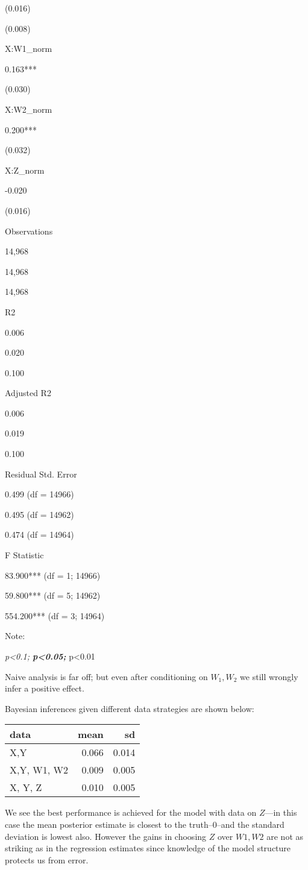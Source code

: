 \documentclass[
  12pt,
]{book}
\begin{document}
(0.016)

(0.008)

X:W1\_norm

0.163***

(0.030)

X:W2\_norm

0.200***

(0.032)

X:Z\_norm

-0.020

(0.016)

Observations

14,968

14,968

14,968

R2

0.006

0.020

0.100

Adjusted R2

0.006

0.019

0.100

Residual Std. Error

0.499 (df = 14966)

0.495 (df = 14962)

0.474 (df = 14964)

F Statistic

83.900*** (df = 1; 14966)

59.800*** (df = 5; 14962)

554.200*** (df = 3; 14964)

Note:

\emph{p\textless0.1; \textbf{p\textless0.05; }}p\textless0.01

Naive analysis is far off; but even after conditioning on \(W_1, W_2\) we still wrongly infer a positive effect.

Bayesian inferences given different data strategies are shown below:

\begin{tabular}{l|r|r}
\hline
data & mean & sd\\
\hline
X,Y & 0.066 & 0.014\\
\hline
X,Y, W1, W2 & 0.009 & 0.005\\
\hline
X, Y, Z & 0.010 & 0.005\\
\hline
\end{tabular}

We see the best performance is achieved for the model with data on \(Z\)---in this case the mean posterior estimate is closest to the truth--0--and the standard deviation is lowest also. However the gains in choosing \(Z\) over \(W1, W2\) are not as striking as in the regression estimates since knowledge of the model structure protects us from error.
\end{document}
